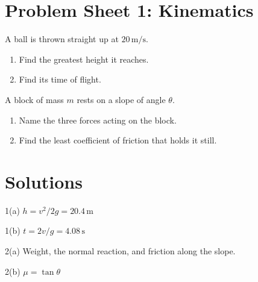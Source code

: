 \documentclass[12pt]{article}
\begin{document}
\section*{Problem Sheet 1: Kinematics}

A ball is thrown straight up at $20\,\mathrm{m/s}$.

\begin{enumerate}
\item Find the greatest height it reaches.
\item Find its time of flight.
\end{enumerate}

A block of mass $m$ rests on a slope of angle $\theta$.

\begin{enumerate}
\item Name the three forces acting on the block.
\item Find the least coefficient of friction that holds it still.
\end{enumerate}

\section*{Solutions}

1(a) $h = v^2 / 2g = 20.4\,\mathrm{m}$

1(b) $t = 2v/g = 4.08\,\mathrm{s}$

2(a) Weight, the normal reaction, and friction along the slope.

2(b) $\mu = \tan\theta$
\end{document}
